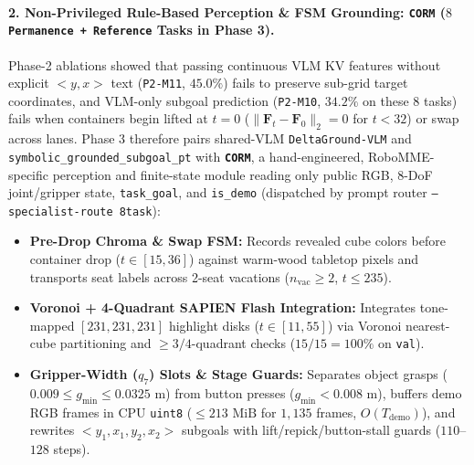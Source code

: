 \documentclass[10pt]{article}
\begin{document}
\paragraph{2. Non-Privileged Rule-Based Perception \& FSM Grounding: \texttt{CORM} ($8$ \texttt{Permanence + Reference} Tasks in Phase 3).}
Phase-2 ablations showed that passing continuous VLM KV features without explicit $<\!y,x\!>$ text (\texttt{P2-M11}, $45.0\%$) fails to preserve sub-grid target coordinates, and VLM-only subgoal prediction (\texttt{P2-M10}, $34.2\%$ on these $8$ tasks) fails when containers begin lifted at $t=0$ ($\|\mathbf{F}_t - \mathbf{F}_0\|_2 = 0$ for $t < 32$) or swap across lanes. Phase 3 therefore pairs shared-VLM \texttt{DeltaGround-VLM} and \texttt{symbolic\_grounded\_subgoal\_pt} with \textbf{\texttt{CORM}}, a hand-engineered, RoboMME-specific perception and finite-state module reading only public RGB, 8-DoF joint/gripper state, \texttt{task\_goal}, and \texttt{is\_demo} (dispatched by prompt router \texttt{--specialist-route 8task}):
\begin{itemize}[leftmargin=1.6em,nosep]
  \item \textbf{Pre-Drop Chroma \& Swap FSM:} Records revealed cube colors before container drop ($t \in [15,36]$) against warm-wood tabletop pixels and transports seat labels across 2-seat vacations ($n_{\mathrm{vac}} \ge 2$, $t \le 235$).
  \item \textbf{Voronoi + 4-Quadrant SAPIEN Flash Integration:} Integrates tone-mapped $[231,231,231]$ highlight disks ($t \in [11,55]$) via Voronoi nearest-cube partitioning and $\ge 3/4$-quadrant checks ($15/15 = 100\%$ on \texttt{val}).
  \item \textbf{Gripper-Width ($q_7$) Slots \& Stage Guards:} Separates object grasps ($0.009 \le g_{\min} \le 0.0325\text{ m}$) from button presses ($g_{\min} < 0.008\text{ m}$), buffers demo RGB frames in CPU \texttt{uint8} ($\le 213\text{ MiB}$ for $1{,}135$ frames, $O(T_{\mathrm{demo}})$), and rewrites $<\!y_1,x_1,y_2,x_2\!>$ subgoals with lift/repick/button-stall guards ($110$--$128$ steps).
\end{itemize}

\end{document}
